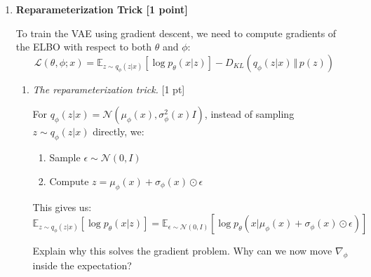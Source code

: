 \documentclass[11pt,english]{article}
\begin{document}
\begin{enumerate}
\begin{enumerate}
      \item \textit{Understanding the ELBO terms.} [1 pt] \textbf{(Required for 7643; Extra Credit for 4644)}

        From part (a), the ELBO can be rewritten as:
        \[
        \mathcal{L}(\theta, \phi; x) 
            = \underbrace{\mathbb{E}_{z \sim q_\phi(z|x)}[\log p_\theta(x|z)]}_{\text{reconstruction term}}
            - \underbrace{D_{KL}(q_\phi(z|x) \,\Vert\, p(z))}_{\text{regularization term}}
        \]
        Suppose we train a VAE but remove the KL term entirely, optimizing only
        $\mathbb{E}_{z \sim q_\phi(z|x)}[\log p_\theta(x|z)]$. What is one degenerate distribution $q_\phi(z|x)$ could collapse to? Why would this break generation at test time, even if reconstruction loss is low?

    \end{enumerate}

    \item \textbf{Reparameterization Trick [1 point]}
    
    To train the VAE using gradient descent, we need to compute gradients of the ELBO with respect to both $\theta$ and $\phi$:
    \[
    \mathcal{L}(\theta, \phi; x) = \mathbb{E}_{z \sim q_\phi(z|x)}[\log p_\theta(x|z)] - D_{KL}(q_\phi(z|x) \,\Vert\, p(z))
    \]
    
    \begin{enumerate}
        \item \textit{The reparameterization trick.} [1 pt]
        
        For $q_\phi(z|x) = \mathcal{N}(\mu_\phi(x), \sigma_\phi^2(x)I)$, instead of sampling $z \sim q_\phi(z|x)$ directly, we:
        \begin{enumerate}
            \item Sample $\epsilon \sim \mathcal{N}(0, I)$
            \item Compute $z = \mu_\phi(x) + \sigma_\phi(x) \odot \epsilon$
        \end{enumerate}
        
        This gives us:
        \[
        \mathbb{E}_{z \sim q_\phi(z|x)}[\log p_\theta(x|z)] = \mathbb{E}_{\epsilon \sim \mathcal{N}(0,I)}[\log p_\theta(x|\mu_\phi(x) + \sigma_\phi(x) \odot \epsilon)]
        \]
        
        Explain why this solves the gradient problem. Why can we now move $\nabla_\phi$ inside the expectation?
        
    \end{enumerate}

\end{enumerate}
\end{document}
